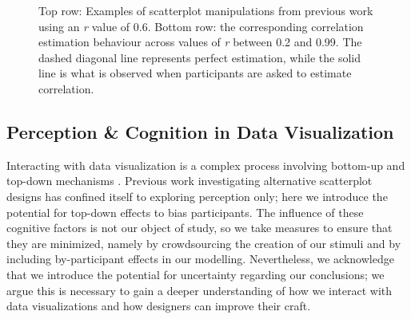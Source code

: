 \documentclass[manuscript,screen,review,anonymous]{acmart}
\begin{document}
\begin{figure}


\caption{\label{fig-previous-manipulations}Top row: Examples of
scatterplot manipulations from previous work using an \textit{r} value
of 0.6. Bottom row: the corresponding correlation estimation behaviour
across values of \textit{r} between 0.2 and 0.99. The dashed diagonal
line represents perfect estimation, while the solid line is what is
observed when participants are asked to estimate correlation.}

\end{figure}%

\subsection{Perception \& Cognition in Data
Visualization}\label{sec-perception-cognition}

Interacting with data visualization is a complex process involving
bottom-up and top-down mechanisms
\citep{shah_2011, franconeri_2021, xiong_2022}. Previous work
investigating alternative scatterplot designs has confined itself to
exploring perception only; here we introduce the potential for top-down
effects to bias participants. The influence of these cognitive factors
is not our object of study, so we take measures to ensure that they are
minimized, namely by crowdsourcing the creation of our stimuli and by
including by-participant effects in our modelling. Nevertheless, we
acknowledge that we introduce the potential for uncertainty regarding
our conclusions; we argue this is necessary to gain a deeper
understanding of how we interact with data visualizations and how
designers can improve their craft.
\end{document}
